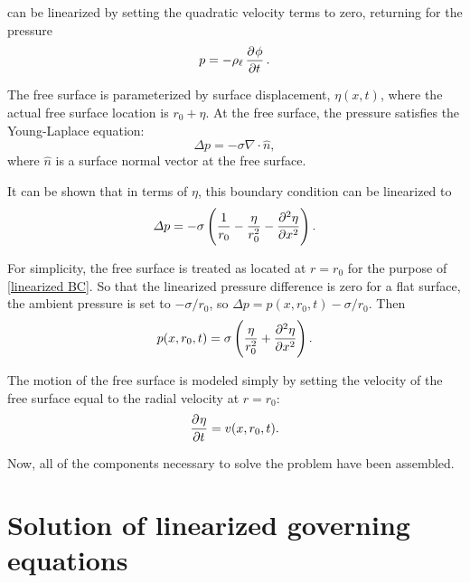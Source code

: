  can be linearized by setting the quadratic velocity terms to zero, returning for the pressure
\begin{equation}
   p = -\rhol \dpd{\phi}{t}. \label{eqn:unsteady Bernoulli linearized}
\end{equation}

The free surface is parameterized by surface displacement, $\eta(x, t)$, where the actual free surface location is $r_0 + \eta$. At the free surface, the pressure satisfies the Young-Laplace equation:
\begin{equation}
   \Delta p = -\sigma \nabla \cdot \hat{n}, \label{eqn:exact BC}
\end{equation}
where $\hat{n}$ is a surface normal vector at the free surface.

It can be shown that in terms of $\eta$, this boundary condition can be linearized to~\citep[p.~975]{berger_initial-value_1988}
\begin{equation}
   \Delta p = -\sigma \left(\frac{1}{r_0} - \frac{\eta}{r_0^2} - \dpd[2]{\eta}{x}\right). \label{eqn:linearized BC}
\end{equation}

For simplicity, the free surface is treated as located at $r = r_0$ for the purpose of \eqref{linearized BC}. So that the linearized pressure difference is zero for a flat surface, the ambient pressure is set to $-\sigma/r_0$, so $\Delta p = p(x, r_0, t) - \sigma/r_0$. Then
\begin{equation}
   p(x, r_0, t) = \sigma \left(\frac{\eta}{r_0^2} + \dpd[2]{\eta}{x}\right). \label{eqn:linearized BC simplified}
\end{equation}

The motion of the free surface is modeled simply by setting the velocity of the free surface equal to the radial velocity at $r = r_0$:
\begin{equation}
   \dpd{\eta}{t} = v(x, r_0, t). \label{eqn:surface displacement evolution}
\end{equation}

Now, all of the components necessary to solve the problem have been assembled.

\section{Solution of linearized governing equations}

